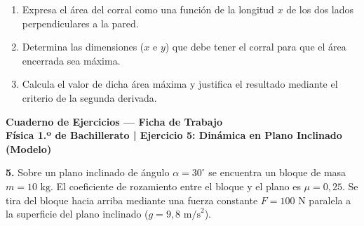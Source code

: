 ﻿\documentclass[11pt,a4paper]{article}
\begin{document}
\vspace{0.3cm}
\begin{enumerate}[label=\textbf{\alph*)}, leftmargin=2em, itemsep=12pt]
    \item Expresa el área del corral como una función de la longitud $x$ de los dos lados perpendiculares a la pared.
    \item Determina las dimensiones ($x$ e $y$) que debe tener el corral para que el área encerrada sea máxima.
    \item Calcula el valor de dicha área máxima y justifica el resultado mediante el criterio de la segunda derivada.
\end{enumerate}

\newpage

\begin{center}
    {\LARGE \textbf{Cuaderno de Ejercicios — Ficha de Trabajo}}\\[4pt]
    {\large \textbf{Física 1.º de Bachillerato | Ejercicio 5: Dinámica en Plano Inclinado (Modelo)}}
\end{center}

\vspace{0.3cm}
\noindent\textbf{5.} Sobre un plano inclinado de ángulo $\alpha = 30^\circ$ se encuentra un bloque de masa $m = 10\text{ kg}$. El coeficiente de rozamiento entre el bloque y el plano es $\mu = 0{,}25$. Se tira del bloque hacia arriba mediante una fuerza constante $F = 100\text{ N}$ paralela a la superficie del plano inclinado ($g = 9{,}8\text{ m/s}^2$).

\begin{center}
\end{center}
\end{document}
